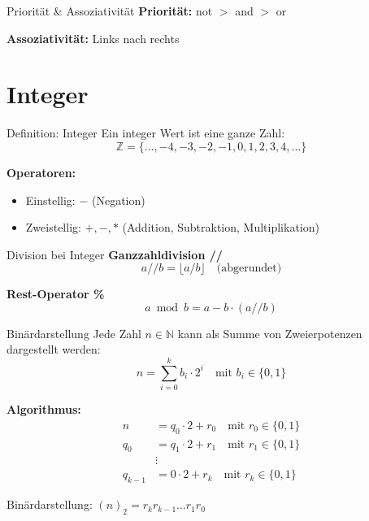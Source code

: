 \documentclass[a4paper, fontsize=7pt]{scrartcl}
\def\N{\mathbb{N}}  %
\def\Z{\mathbb{Z}}  %
\begin{document}
\begin{subbox}{Priorität \& Assoziativität}
\textbf{Priorität:} not $>$ and $>$ or

\textbf{Assoziativität:} Links nach rechts
\end{subbox}

\section{Integer}

\begin{mainbox}{Definition: Integer}
Ein integer Wert ist eine ganze Zahl:
$$\Z = \{\ldots, -4, -3, -2, -1, 0, 1, 2, 3, 4, \ldots\}$$

\textbf{Operatoren:}
\begin{itemize}
    \item Einstellig: $-$ (Negation)
    \item Zweistellig: $+, -, \ast$ (Addition, Subtraktion, Multiplikation)
\end{itemize}
\end{mainbox}

\begin{mainbox}{Division bei Integer}
\textbf{Ganzzahldivision //}
$$a \mathbin{//} b = \lfloor a/b \rfloor \quad \text{(abgerundet)}$$

\textbf{Rest-Operator \%}
$$a \bmod b = a - b \cdot (a \mathbin{//} b)$$
\end{mainbox}

\begin{mainbox}{Binärdarstellung}
Jede Zahl $n \in \N$ kann als Summe von Zweierpotenzen dargestellt werden:
$$n = \sum_{i=0}^{k} b_i \cdot 2^i \quad \text{mit } b_i \in \{0,1\}$$

\textbf{Algorithmus:}
\begin{align*}
n &= q_0 \cdot 2 + r_0 \quad \text{mit } r_0 \in \{0,1\} \\
q_0 &= q_1 \cdot 2 + r_1 \quad \text{mit } r_1 \in \{0,1\} \\
&\vdots \\
q_{k-1} &= 0 \cdot 2 + r_k \quad \text{mit } r_k \in \{0,1\}
\end{align*}

Binärdarstellung: $(n)_2 = r_k r_{k-1} \ldots r_1 r_0$
\end{mainbox}
\end{document}
